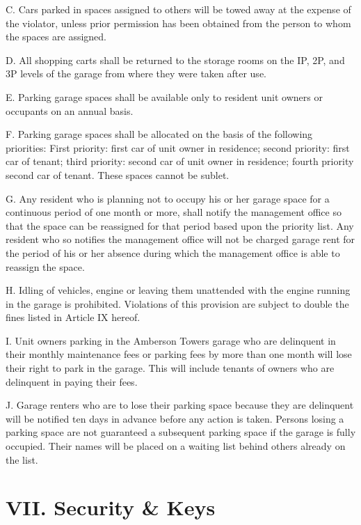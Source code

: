 \documentclass[
]{book}
\begin{document}
C. Cars parked in spaces assigned to others will be towed away at the expense of the violator, unless prior permission has been obtained from the person to whom the spaces are assigned.

D. All shopping carts shall be returned to the storage rooms on the IP, 2P, and 3P levels of the garage from where they were taken after use.

E. Parking garage spaces shall be available only to resident unit owners or occupants on an annual basis.

F. Parking garage spaces shall be allocated on the basis of the following priorities: First priority: first car of unit owner in residence; second priority: first car of tenant; third priority: second car of unit owner in residence; fourth priority second car of tenant. These spaces cannot be sublet.

G. Any resident who is planning not to occupy his or her garage space for a continuous period of one month or more, shall notify the management office so that the space can be reassigned for that period based upon the priority list. Any resident who so notifies the management office will not be charged garage rent for the period of his or her absence during which the management office is able to reassign the space.

H. Idling of vehicles, engine or leaving them unattended with the engine running in the garage is prohibited. Violations of this provision are subject to double the fines listed in Article IX hereof.

I. Unit owners parking in the Amberson Towers garage who are delinquent in their monthly maintenance fees or parking fees by more than one month will lose their right to park in the garage. This will include tenants of owners who are delinquent in paying their fees.

J. Garage renters who are to lose their parking space because they are delinquent will be notified ten days in advance before any action is taken. Persons losing a parking space are not guaranteed a subsequent parking space if the garage is fully occupied. Their names will be placed on a waiting list behind others already on the list.

\hypertarget{vii.-security-keys-1}{%
\section*{VII. Security \& Keys}\label{vii.-security-keys-1}}
\end{document}
